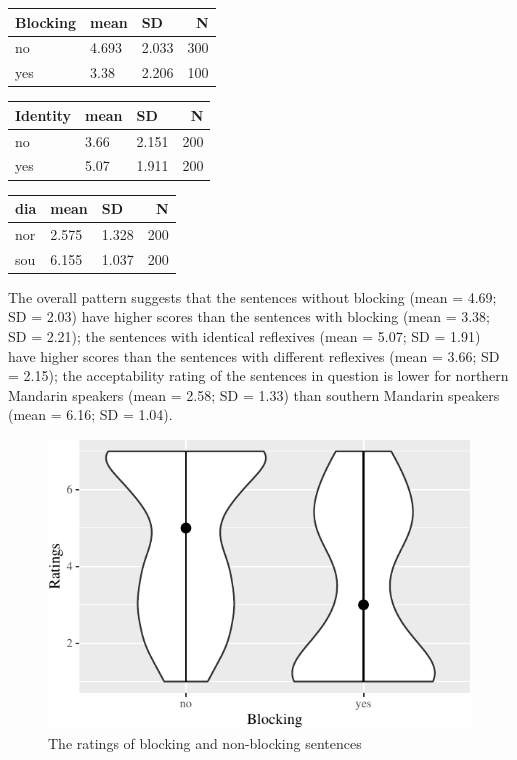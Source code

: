 \documentclass[
  english,
  man,floatsintext]{apa6}
\begin{document}
\begin{table}

\centering
\begin{tabular}[t]{l|l|l|r}
\hline
Blocking & mean & SD & N\\
\hline
no & 4.693 & 2.033 & 300\\
\hline
yes & 3.38 & 2.206 & 100\\
\hline
\end{tabular}
\centering
\begin{tabular}[t]{l|l|l|r}
\hline
Identity & mean & SD & N\\
\hline
no & 3.66 & 2.151 & 200\\
\hline
yes & 5.07 & 1.911 & 200\\
\hline
\end{tabular}
\centering
\begin{tabular}[t]{l|l|l|r}
\hline
dia & mean & SD & N\\
\hline
nor & 2.575 & 1.328 & 200\\
\hline
sou & 6.155 & 1.037 & 200\\
\hline
\end{tabular}
\end{table}

The overall pattern suggests that the sentences without blocking (mean = 4.69; SD = 2.03) have higher scores than the sentences with blocking (mean = 3.38; SD = 2.21); the sentences with identical reflexives (mean = 5.07; SD = 1.91) have higher scores than the sentences with different reflexives (mean = 3.66; SD = 2.15); the acceptability rating of the sentences in question is lower for northern Mandarin speakers (mean = 2.58; SD = 1.33) than southern Mandarin speakers (mean = 6.16; SD = 1.04).

\begin{figure}

{\centering \includegraphics{manuscript_files/figure-latex/plot11-1} 

}

\caption{The ratings of blocking and non-blocking sentences}\label{fig:plot11}
\end{figure}
\end{document}
